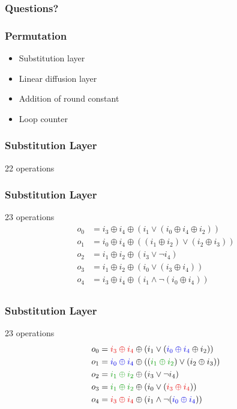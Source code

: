 \documentclass[17pt]{beamer}
\newcommand{\xor}[0]{\oplus}
\newcommand{\red}[1]{\textcolor[rgb]{0.9,0.0,0.0}{#1}}
\newcommand{\blu}[1]{\textcolor[rgb]{0.0,0.0,0.9}{#1}}
\newcommand{\grn}[1]{\textcolor[rgb]{0.0,0.6,0.0}{#1}}
\begin{document}
\begin{frame}
    \frametitle{Questions?}
\end{frame}

\begin{frame}
    \frametitle{Permutation}
    \begin{itemize}
        \item Substitution layer
        \item Linear diffusion layer
        \item Addition of round constant
        \item Loop counter
    \end{itemize}
\end{frame}

\begin{frame}[t]
    \frametitle{Substitution Layer}
    22 operations
    \vfill
    \begin{center}
        
    \end{center}
\end{frame}

\begin{frame}[t]
    \frametitle{Substitution Layer}
    23 operations
    \begin{align*}
        o_0 & = i_3 \xor i_4 \xor (i_1 \vee (i_0 \xor i_4 \xor i_2)) \\
        o_1 & = i_0 \xor i_4 \xor ((i_1 \xor i_2) \vee (i_2 \xor i_3)) \\
        o_2 & = i_1 \xor i_2 \xor (i_3 \vee \neg i_4) \\
        o_3 & = i_1 \xor i_2 \xor (i_0 \vee (i_3 \xor i_4)) \\
        o_4 & = i_3 \xor i_4 \xor (i_1 \wedge \neg (i_0 \xor i_4)) \\
    \end{align*}
\end{frame}

\begin{frame}[t]
    \frametitle{Substitution Layer}
    23 operations
    \begin{align*}
        o_0 & = \red{i_3 \xor i_4} \xor (i_1 \vee (\blu{i_0 \xor i_4} \xor i_2)) \\
        o_1 & = \blu{i_0 \xor i_4} \xor ((\grn{i_1 \xor i_2}) \vee (i_2 \xor i_3)) \\
        o_2 & = \grn{i_1 \xor i_2} \xor (i_3 \vee \neg i_4) \\
        o_3 & = \grn{i_1 \xor i_2} \xor (i_0 \vee (\red{i_3 \xor i_4})) \\
        o_4 & = \red{i_3 \xor i_4} \xor (i_1 \wedge \neg (\blu{i_0 \xor i_4})) \\
    \end{align*}
\end{frame}
\end{document}
